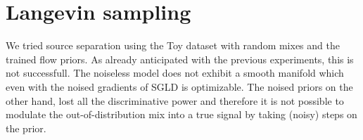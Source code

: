 \section{Langevin sampling}
We tried source separation using the Toy dataset with random mixes and the trained flow priors. As already anticipated with the previous experiments, this is not successfull. The noiseless model does not exhibit a smooth manifold which even with the noised gradients of SGLD is optimizable. The noised priors on the other hand, lost all the discriminative power and therefore it is not possible to modulate the out-of-distribution mix into a true signal by taking (noisy) steps on the prior.
